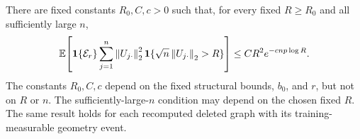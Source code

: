 \begin{lemma}
\label{restore:tail-energy-lemma}
There are fixed constants $R_0,C,c>0$ such that, for every fixed
$R\ge R_0$ and all sufficiently large $n$,
\begin{equation}
 \mathbb E\!\left[\mathbf1\{\mathcal E_r\}
       \sum_{j=1}^n\left\lVert U_{j\cdot}\right\rVert_2^2
                  \mathbf1\{\sqrt n\left\lVert U_{j\cdot}\right\rVert_2>R\}\right]
 \le CR^2e^{-c{np}\log R}.
 \label{restore:tail-energy}
\end{equation}
The constants $R_0,C,c$ depend on the fixed structural bounds,
$b_0$, and $r$, but not on $R$ or $n$.  The sufficiently-large-$n$
condition may depend on the chosen fixed $R$.  The same result holds
for each recomputed deleted graph with its training-measurable
geometry event.
\end{lemma}


